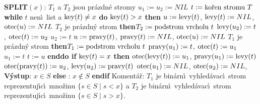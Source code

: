 {\bf SPLIT$(x)$}:\newline 
$T_1$ a $T_2$ jsou pr\'azdn\'e stromy\newline 
$u_1:=u_2:=NIL$\newline 
$t:=\text{\rm ko\v ren stromu }T$\newline 
{\bf while} $t$ nen\'\i\ list a $\operatorname{key}(t)\ne x$ {\bf do\newline}
\phantom{---}{\bf if} $\operatorname{key}(t)>x$ {\bf then\newline 
\phantom{------}$u:=\operatorname{levy}(t)$}, $\operatorname{levy}(t):=NIL$, $\operatorname{otec}(u):=NIL$\newline 
\phantom{------}{\bf if} $T_2$ je pr\'azdn\'y strom {\bf then}\newline \phantom{---------}$T_2:=\text{\rm podstrom vrcholu }t$\newline
\phantom{------}{\bf else}\newline 
\phantom{---------}$\operatorname{levy}(u_2):=t$, $\operatorname{otec}(t):=u_2$\newline 
\phantom{------}{\bf endif}\newline
\phantom{------}$u_2:=t$\newline 
\phantom{---}{\bf else}\newline 
\phantom{------}$u:=\operatorname{pravy}(t)$, $\operatorname{pravy}(t):=NIL$, $\operatorname{otec}(u):=NIL$\newline
\phantom{------}{\bf if} $T_1$ je pr\'azdn\'y strom {\bf then}\newline \phantom{---------}$T_1:=\text{\rm podstrom vrcholu }t$\newline
\phantom{------}{\bf else}\newline 
\phantom{---------}$\operatorname{pravy}(u_1):=t$, $\operatorname{otec}(t):=u_1$\newline 
\phantom{------}{\bf endif}\newline
\phantom{------}$u_1:=t$\newline 
\phantom{---}{\bf endif}\newline 
\phantom{---}$t:=u$\newline 
{\bf enddo\newline 
if} $\operatorname{key}(t)=x$ {\bf then}\newline 
\phantom{---}$\operatorname{otec}(\operatorname{levy}(t)):=u_1$, $\operatorname{pravy}(u_1):=\operatorname{levy}(t)$\newline 
\phantom{---}$\operatorname{otec}(\operatorname{pravy}(t)):=u_2$, $\operatorname{levy}(u_2):=\operatorname{pravy}(t)$\newline 
\phantom{---}$\operatorname{otec}(u_1):=NIL$, $\operatorname{otec}(u_2):=NIL$, {\bf V\'ystup}: $x\in S$\newline 
{\bf else}\newline 
\phantom{---}{\bf V\'ystup}: $x\notin S$\newline 
{\bf endif\newline }
Koment\'a\v r: $T_1$ je bin\'arn\'\i\ vyhled\'avac\'\i\ strom reprezentuj\'\i c\'\i\ 
mno\-\v zi\-nu 
$\{s\in S\mid s<x\}$ a $T_2$ je bin\'arn\'\i\ vyhled\'avac\'\i\ strom 
reprezentuj\'\i c\'\i\ mno\v zinu $\{s\in S\mid s>x\}$.
\medskip

